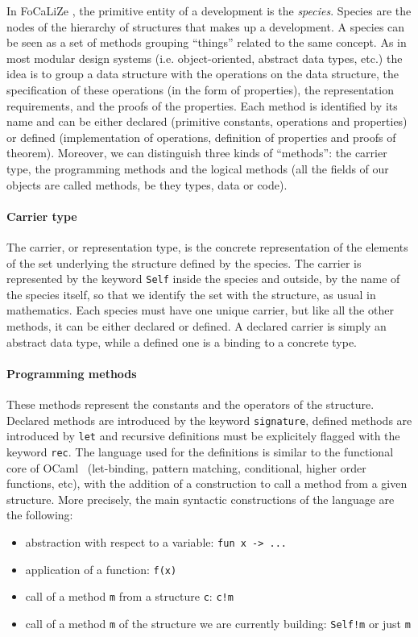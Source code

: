 \documentclass[submission,copyright,creativecommons]{eptcs}
\def\focalize{FoCaLiZe \mbox{}}
\begin{document}
In \focalize, the primitive entity of a development is the \emph{species}.
Species are the nodes of the
hierarchy of structures that makes up a development.
A species can be seen as a set of methods grouping ``things'' related
to the same concept. As in most modular design systems
(i.e. object-oriented, abstract data types, etc.) the idea is
to group a data structure with the operations on the data structure, the
specification of these operations (in the form of properties), the
representation requirements, and the proofs of the properties.
Each method is identified by
its name and can be either declared 
(primitive constants, operations and properties)
or defined (implementation of operations, definition of properties and proofs of theorem).
Moreover, we can distinguish three kinds of ``methods'': the carrier type, the
programming methods and the logical methods (all the fields of our
objects are called methods, be they types, data or code).

\paragraph{Carrier type}
The carrier, or representation type, is the concrete representation of
the elements of the set underlying the structure defined
by the species. 
The carrier is represented by the keyword {\small \tt Self} inside
the species and outside, by the name of the species itself, so that we
identify the
set with the structure, as usual in mathematics.
Each species must have one unique carrier, but like all the other methods, it
can be either declared or defined. A declared carrier is simply an abstract 
data type, while a defined one is a binding to a concrete type.

\paragraph{Programming methods}
These methods represent the constants and the operators of the structure.
Declared methods are introduced by the keyword
{\small \tt signature}, defined methods are introduced by {\small \tt let} and recursive
definitions must be explicitely flagged with the keyword {\small \tt rec}. The
language used for the definitions is similar to the functional core of 
OCaml~\cite{ocamldocu} (let-binding, pattern matching, conditional,
higher order functions, etc),
with the addition of a construction to call a method from a given
structure. More precisely, the main syntactic constructions of the
language are the following:
\begin{itemize}
\item abstraction with respect to a variable: {\small \tt fun x -> ...}
\item application of a function: {\small  \tt f(x)}
\item call of a method {\small \tt m} from a structure {\small \tt c}: 
{\small \tt c!m}
\item call of a method {\small \tt m} of the structure we are currently building:
{\small \tt Self!m} or just {\small \tt m}
\end{itemize}
\end{document}
